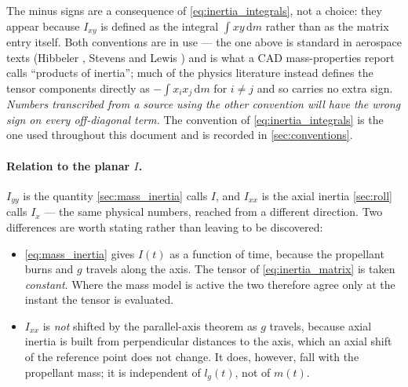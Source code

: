 The minus signs are a consequence of \autoref{eq:inertia_integrals}, not a choice: they appear
because $I_{xy}$ is defined as the integral $\int xy\,\mathrm{d}m$ rather than as the matrix entry
itself. Both conventions are in use --- the one above is standard in aerospace texts (Hibbeler
\cite{hibbeler}, Stevens and Lewis \cite{stevenslewis}) and is what a CAD mass-properties report
calls ``products of inertia''; much of the physics literature instead defines the tensor
components directly as $-\!\int x_ix_j\,\mathrm{d}m$ for $i\neq j$ and so carries no extra sign.
\emph{Numbers transcribed from a source using the other convention will have the wrong sign on
every off-diagonal term.} The convention of \autoref{eq:inertia_integrals} is the one used
throughout this document and is recorded in \autoref{sec:conventions}.

\paragraph{Relation to the planar $I$.} $I_{yy}$ is the quantity \autoref{sec:mass_inertia} calls
$I$, and $I_{xx}$ is the axial inertia \autoref{sec:roll} calls $I_x$ --- the same physical numbers,
reached from a different direction. Two differences are worth stating rather than leaving to be
discovered:
\begin{itemize}
    \item \autoref{eq:mass_inertia} gives $I(t)$ as a function of time, because the propellant
    burns and $g$ travels along the axis. The tensor of \autoref{eq:inertia_matrix} is taken
    \emph{constant}. Where the mass model is active the two therefore agree only at the instant the
    tensor is evaluated.
    \item $I_{xx}$ is \emph{not} shifted by the parallel-axis theorem as $g$ travels, because axial
    inertia is built from perpendicular distances to the axis, which an axial shift of the
    reference point does not change. It does, however, fall with the propellant mass; it is
    independent of $l_g(t)$, not of $m(t)$.
\end{itemize}

